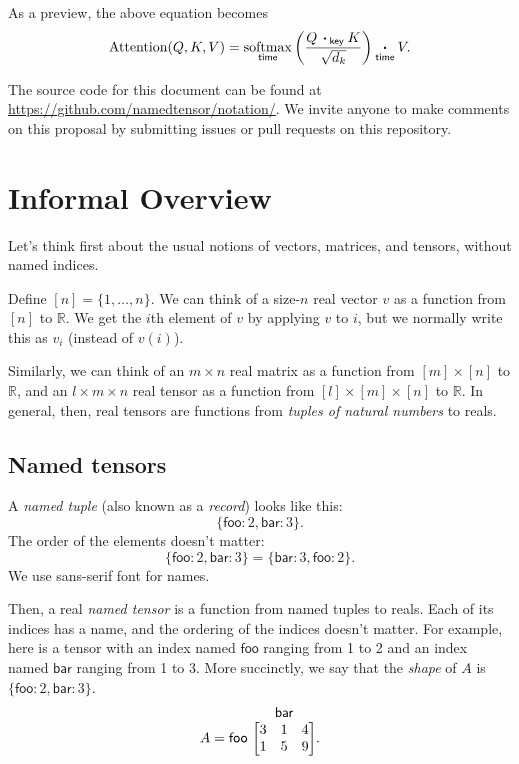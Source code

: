\documentclass{article}
\makeatletter
\newcommand{\name}[1]{\mathsf{#1}}
\newcommand{\ndot}[1]{\mathbin{\mathop{\thinspace\boldsymbol\cdot\thinspace}\displaylimits_{\name{#1}}}}
\DeclareMathOperator*{\softmax}{softmax}
\newcommand{\tuple}[1]{\{ #1\}}
\newcommand{\namedmatrix}[3]{%
\ifx #1\end\end \else #1\ \fi
\begin{array}[b]{@{}c@{}} \smash{#2} \\ \begin{bmatrix} #3 \end{bmatrix} \end{array}
}
\makeatother
\begin{document}
As a preview, the above equation becomes
\begin{equation*}
  \text{Attention}(Q,K,V) = \softmax_{\name{time}} \left( \frac{Q \ndot{key} K}{\sqrt{d_k}} \right) \ndot{time} V.
\end{equation*}

The source code for this document can be found at \url{https://github.com/namedtensor/notation/}. We invite anyone to make comments on this proposal by submitting issues or pull requests on this repository.

\section{Informal Overview}
\label{sec:intro}

Let's think first about the usual notions of vectors, matrices, and tensors, without named indices.

Define $[n] = \{1, \ldots, n\}$. We can think of a size-$n$ real vector $v$ as a function from $[n]$ to $\mathbb{R}$. We get the $i$th element of $v$ by applying $v$ to $i$, but we normally write this as $v_i$ (instead of $v(i)$). 

Similarly, we can think of an $m \times n$ real matrix as a function from $[m] \times [n]$ to $\mathbb{R}$, and an $l \times m \times n$ real tensor as a function from $[l] \times [m] \times [n]$ to $\mathbb{R}$. In general, then, real tensors are functions from \emph{tuples of natural numbers} to reals.

\subsection{Named tensors}

A \emph{named tuple} (also known as a \emph{record}) looks like this: \[\tuple{\name{foo}: 2, \name{bar}: 3}.\] The order of the elements doesn't matter: \[\tuple{\name{foo}: 2, \name{bar}: 3} = \tuple{\name{bar}: 3, \name{foo}: 2}.\] We use \textsf{sans-serif} font for names.

Then, a real \emph{named tensor} is a function from named tuples to reals. Each of its indices has a name, and the ordering of the indices doesn't matter. For example, here is a tensor with an index named $\name{foo}$ ranging from 1 to 2 and an index named $\name{bar}$ ranging from 1 to 3. More succinctly, we say that the \emph{shape} of $A$ is $\tuple{\name{foo}:2, \name{bar}:3}$.
\begin{equation*}
A = \namedmatrix{\name{foo}}{\name{bar}}{
  3 & 1 & 4 \\
  1 & 5 & 9
}.
\end{equation*}
\end{document}

